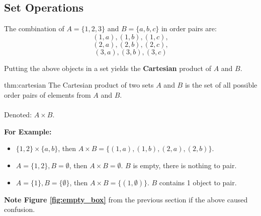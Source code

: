 \subsection{Set Operations}

The combination of $A=\{1,2,3\}$ and $B=\{a,b,c\}$ in order pairs are:
$$(1,a), (1,b), (1,c), $$
$$(2,a), (2,b), (2,c), $$
$$(3,a), (3,b), (3,c)$$

\noindent
Putting the above objects in a set yields the \textbf{Cartesian} product of $A$ and $B$.


\begin{theo}[Cartesian]{thm:cartesian}
    The Cartesian product of two sets $A$ and $B$ is the set of all possible order
    pairs of elements from $A$ and $B$.\\\\
    Denoted: $A \times B$.
\end{theo}

\noindent
\textbf{For Example:}
\begin{itemize}
    \item $\{1, 2\} \times \{a, b\}$, then $A \times B = \{(1,a), (1,b), (2,a), (2,b)\}$.
    \item $A = \{1,2\}, B = \emptyset$, then $A \times B = \emptyset$. $B$ is empty, there is nothing to pair.
    \item $A = \{1\}, B = \{\emptyset\}$, then $A \times B = \{(1,\emptyset)\}$. $B$ contains 1 object to pair.
\end{itemize}
\textbf{Note Figure \ref{fig:empty_box}} from the previous section if the above caused confusion.


